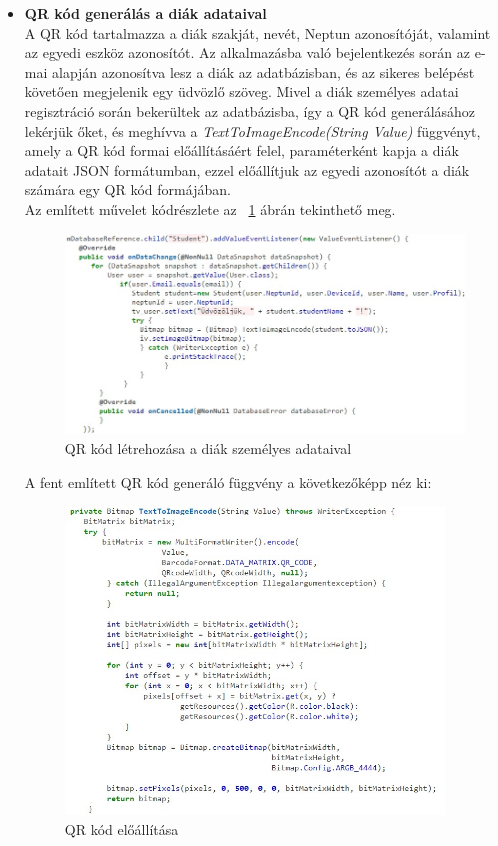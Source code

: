 \documentclass[12pt]{article}
\numberwithin{figure}{section}
\numberwithin{equation}{section}
\begin{document}
\begin{itemize}
\newpage
	
	\item \textbf{QR kód generálás a diák adataival}\\
	A QR kód tartalmazza a diák szakját, nevét, Neptun azonosítóját, valamint az egyedi eszköz azonosítót. Az alkalmazásba való bejelentkezés során az e-mai alapján azonosítva lesz a diák az adatbázisban, és az sikeres belépést követően megjelenik egy üdvözlő szöveg.  Mivel a diák személyes adatai regisztráció során bekerültek az adatbázisba, így a QR kód generálásához lekérjük őket, és meghívva a \textit{TextToImageEncode(String Value)} függvényt, amely a QR kód formai előállításáért felel, paraméterként kapja a diák adatait JSON formátumban, ezzel előállítjuk az egyedi azonosítót a diák számára egy QR kód formájában.\\
	Az említett művelet kódrészlete az ~\ref{fig:create_qr} ábrán tekinthető meg.\\
	
	\begin{figure}[H]
		\centering
		\includegraphics[width=400px]{qr_data2.jpg}
		\caption{QR kód létrehozása a diák személyes adataival}
		\label{fig:create_qr}
	\end{figure}

\newpage

A fent említett QR kód generáló függvény a következőképp néz ki:
	\begin{figure}[H]
		\centering
		\includegraphics[width=380px]{qr.jpg}
		\caption{QR kód előállítása}
	\end{figure}



\end{itemize}
\end{document}
